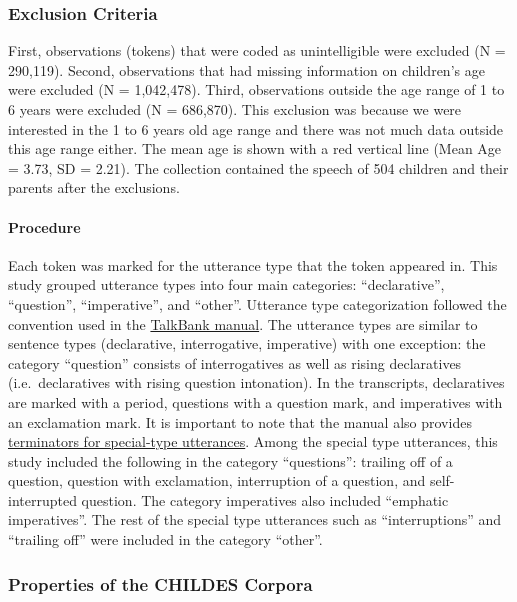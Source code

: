 \documentclass[floatsintext,man]{apa6}
\theoremstyle{definition}
\theoremstyle{definition}
\theoremstyle{definition}
\theoremstyle{remark}
\begin{document}
\subsubsection{Exclusion Criteria}\label{exclusion-criteria}

First, observations (tokens) that were coded as unintelligible were
excluded (N = 290,119). Second, observations that had missing
information on children's age were excluded (N = 1,042,478). Third,
observations outside the age range of 1 to 6 years were excluded (N =
686,870). This exclusion was because we were interested in the 1 to 6
years old age range and there was not much data outside this age range
either. The mean age is shown with a red vertical line (Mean Age = 3.73,
SD = 2.21). The collection contained the speech of 504 children and
their parents after the exclusions.

\paragraph{Procedure}\label{procedure}

Each token was marked for the utterance type that the token appeared in.
This study grouped utterance types into four main categories:
\enquote{declarative}, \enquote{question}, \enquote{imperative}, and
\enquote{other}. Utterance type categorization followed the convention
used in the
\href{https://talkbank.org/manuals/CHAT.html\#_Toc486414422}{TalkBank
manual}. The utterance types are similar to sentence types (declarative,
interrogative, imperative) with one exception: the category
\enquote{question} consists of interrogatives as well as rising
declaratives (i.e.~declaratives with rising question intonation). In the
transcripts, declaratives are marked with a period, questions with a
question mark, and imperatives with an exclamation mark. It is important
to note that the manual also provides
\href{https://talkbank.org/manuals/CHAT.html\#_Toc486414431}{terminators
for special-type utterances}. Among the special type utterances, this
study included the following in the category \enquote{questions}:
trailing off of a question, question with exclamation, interruption of a
question, and self-interrupted question. The category imperatives also
included \enquote{emphatic imperatives}. The rest of the special type
utterances such as \enquote{interruptions} and \enquote{trailing off}
were included in the category \enquote{other}.\\

\subsubsection{Properties of the CHILDES
Corpora}\label{properties-of-the-childes-corpora}
\end{document}
